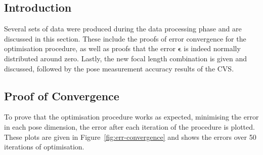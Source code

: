 \subsection{Introduction}

Several sets of data were produced during the data processing phase and are discussed in this section. These include the proofs of error convergence for the optimisation procedure, as well as proofs that the error $\bm{\epsilon}$ is indeed normally distributed around zero. Lastly, the new focal length combination is given and discussed, followed by the pose measurement accuracy results of the CVS. 

\subsection{Proof of Convergence}

To prove that the optimisation procedure works as expected, minimising the error in each pose dimension, the error after each iteration of the procedure is plotted. These plots are given in Figure~\ref{fig:err-convergence} and shows the errors over 50 iterations of optimisation.  

